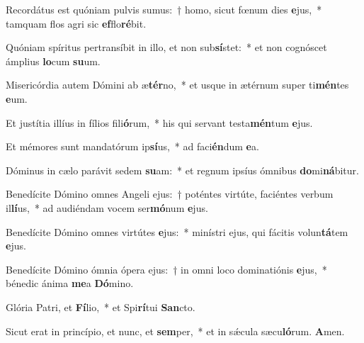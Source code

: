 \item Recordátus est quóniam pulvis sumus:~† homo, sicut fœnum dies \textbf{e}jus,~* tamquam flos agri sic \textbf{ef}flo\textbf{ré}bit.
\item Quóniam spíritus pertransíbit in illo, et non sub\textbf{sí}stet:~* et non cognóscet ámplius \textbf{lo}cum \textbf{su}um.
\item Misericórdia autem Dómini ab æ\textbf{tér}no,~* et usque in ætérnum super ti\textbf{mén}tes \textbf{e}um.
\item Et justítia illíus in fílios fili\textbf{ó}rum,~* his qui servant testa\textbf{mén}tum \textbf{e}jus.
\item Et mémores sunt mandatórum ip\textbf{sí}us,~* ad faci\textbf{én}dum \textbf{e}a.
\item Dóminus in cælo parávit sedem \textbf{su}am:~* et regnum ipsíus ómnibus \textbf{do}mi\textbf{ná}bitur.
\item Benedícite Dómino omnes Angeli ejus:~† poténtes virtúte, faciéntes verbum il\textbf{lí}us,~* ad audiéndam vocem ser\textbf{mó}num \textbf{e}jus.
\item Benedícite Dómino omnes virtútes \textbf{e}jus:~* minístri ejus, qui fácitis volun\textbf{tá}tem \textbf{e}jus.
\item Benedícite Dómino ómnia ópera ejus:~† in omni loco dominatiónis \textbf{e}jus,~* bénedic ánima \textbf{me}a \textbf{Dó}mino.
\item Glória Patri, et \textbf{Fí}lio,~* et Spi\textbf{rí}tui \textbf{San}cto.
\item Sicut erat in princípio, et nunc, et \textbf{sem}per,~* et in sǽcula sæcu\textbf{ló}rum. \textbf{A}men.
